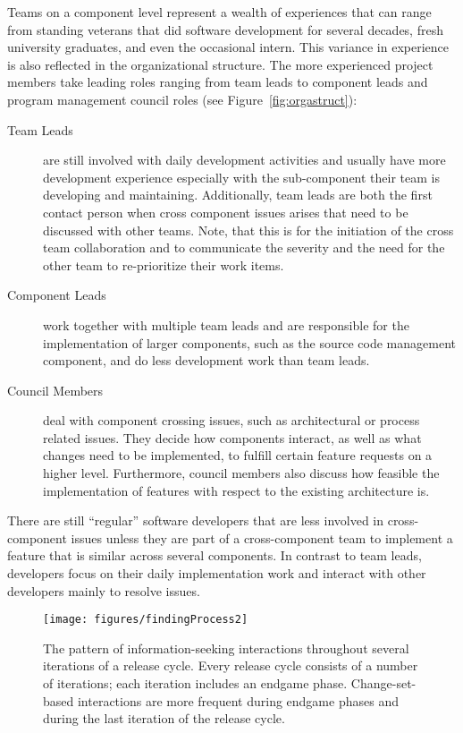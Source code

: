 Teams on a component level represent a wealth of experiences that can range from standing veterans that did software development for several decades, fresh university graduates, and even the occasional intern.
This variance in experience is also reflected in the organizational structure.
The more experienced project members take leading roles ranging from team leads to component leads and program management council roles (see Figure~\ref{fig:orgastruct}):
\begin{description}
\item[Team Leads] are still involved with daily development activities and usually have more development experience especially with the sub-component their team is developing and maintaining.
Additionally, team leads are both the first contact person when cross component issues arises that need to be discussed with other teams.
Note, that this is for the initiation of the cross team collaboration and to communicate the severity and the need for the other team to re-prioritize their work items.
\item[Component Leads] work together with multiple team leads and are responsible for the implementation of larger components, such as the source code management component, and do less development work than team leads.
\item[Council Members] deal with component crossing issues, such as architectural or process related issues.
They decide how components interact, as well as what changes need to be implemented, to fulfill certain feature requests on a higher level.
Furthermore, council members also discuss how feasible the implementation of features with respect to the existing architecture is.
\end{description}
There are still ``regular'' software developers that are less involved in cross-component issues unless they are part of a cross-component team to implement a feature that is similar across several components.
In contrast to team leads, developers focus on their daily implementation work and interact with other developers mainly to resolve issues.

\begin{figure}[t]
\centering
\texttt{[image: figures/findingProcess2]}
\vspace{-20pt}\caption{The pattern of information-seeking interactions throughout several iterations of a release cycle. Every release cycle consists of a number of iterations; each iteration includes an endgame phase. Change-set-based interactions are more frequent during endgame phases and during the last iteration of the release cycle.}
\label{IterationsFig1}
\end{figure}

